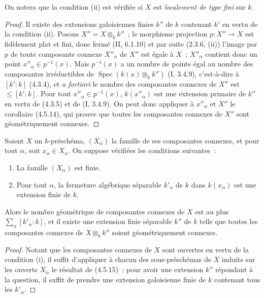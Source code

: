 On notera que la condition (ii) est vérifiée si $X$ est \emph{localement de
type fini} sur $k$.

\begin{proof}
Il existe des extensions galoisiennes finies $k''$ de $k$ contenant $k'$ en
vertu de la condition (ii). Posons $X''=X\otimes_k k''$~; le morphisme
projection $p:X''\to X$ est fidèlement plat et fini, donc fermé (II, 6.1.10) et
par suite (2.3.6, (ii)) l'image par $p$ de toute composante connexe $X''_\alpha$
de $X''$ est égale à $X$~; $X''_\alpha$ contient donc un point
$x''_\alpha\in p^{-1}(x)$. Mais $p^{-1}(x)$ a un nombre de points égal au
nombre des composantes irréductibles de
$\operatorname{Spec}(k(x)\otimes_k k'')$ (I, 3.4.9), c'est-à-dire à $[k':k]$
(4.3.4), et \emph{a fortiori} le nombre des composantes connexes de $X''$ est
$\leqslant[k':k]$. Pour tout $x''_\alpha\in p^{-1}(x)$, $k(x''_\alpha)$ est une
extension primaire de $k''$ en vertu de (4.3.5) et de (I, 3.4.9). On peut donc
appliquer à $x''_\alpha$ et $X''$ le corollaire (4.5.14), qui prouve que toutes
les composantes connexes de $X''$ sont géométriquement connexes.
\end{proof}

\begin{corollary}[4.5.16]
\label{IV.2.4.5.16-fr}
Soient $X$ un $k$-préschéma, $(X_\alpha)$ la famille de ses composantes
connexes, et pour tout $\alpha$, soit $x_\alpha\in X_\alpha$. On suppose
vérifiées les conditions suivantes~:
\begin{enumerate}
\item[(i)] La famille $(X_\alpha)$ est finie.
\item[(ii)] Pour tout $\alpha$, la fermeture algébrique séparable $k'_\alpha$
de $k$ dans $k(x_\alpha)$ est une extension finie de $k$.
\end{enumerate}
Alors le nombre géométrique de composantes connexes de $X$ est au plus
$\sum_\alpha[k'_\alpha:k]$, et il existe une extension finie séparable $k''$ de
$k$ telle que toutes les composantes connexes de $X\otimes_k k''$ soient
géométriquement connexes.
\end{corollary}

\begin{proof}
Notant que les composantes connexes de $X$ sont ouvertes en vertu de la
condition (i), il suffit d'appliquer à chacun des sous-préschémas de $X$ induits
sur les ouverts $X_\alpha$ le résultat de (4.5.15)~; pour avoir une extension
$k''$ répondant à la question, il suffit de prendre une extension galoisienne
finie de $k$ contenant tous les $k'_\alpha$.
\end{proof}


